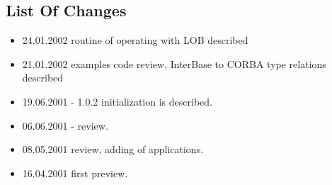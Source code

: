 \documentclass[10pt]{article}
\begin{document}
\subsection{List Of Changes}

\begin{itemize}
  \item 24.01.2002 routine of operating with LOB described
  \item 21.01.2002 examples code review, InterBase to CORBA type relations described
  \item 19.06.2001 - 1.0.2 initialization is described.
  \item 06.06.2001 - review.
  \item 08.05.2001 review, adding of applications.
  \item 16.04.2001 first preview.
\end{itemize}


\end{document}
